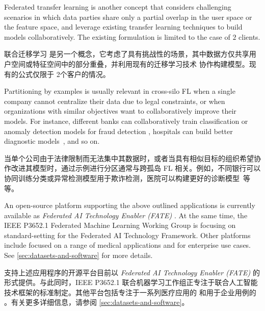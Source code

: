 Federated transfer learning \citep{DBLP:journals/corr/abs-1902-04885} is another concept that considers challenging scenarios in which data parties share only a partial overlap in the user space or the feature space, and leverage existing transfer learning techniques \cite{Pan:2010:STL:1850483.1850545} to build models collaboratively. The existing formulation is limited to the case of $2$ clients.

联合迁移学习 \citep{DBLP:journals/corr/abs-1902-04885} 是另一个概念，它考虑了具有挑战性的场景，其中数据方仅共享用户空间或特征空间中的部分重叠，并利用现有的迁移学习技术 \cite{Pan:2010:STL:1850483.1850545} 协作构建模型。现有的公式仅限于 2个客户的情况。

Partitioning by examples is usually relevant in cross-silo FL when a single company cannot centralize their data due to legal constraints, or when organizations with similar objectives want to collaboratively improve their models. For instance, different banks can collaboratively train classification or anomaly detection models for fraud detection \citep{webankswissre19reinsurance}, hospitals can build better diagnostic models~\citep{courtiol2019deep}, and so on.

当单个公司由于法律限制而无法集中其数据时，或者当具有相似目标的组织希望协作改进其模型时，通过示例进行分区通常与跨孤岛 FL 相关。例如，不同银行可以协同训练分类或异常检测模型用于欺诈检测\citep{webankswissre19reinsurance}，医院可以构建更好的诊断模型~\citep{courtiol2019deep}等等。

An open-source platform supporting the above outlined applications is currently available as \textit{Federated AI Technology Enabler (FATE)} \citep{FATE}. At the same time, the IEEE P3652.1 Federated Machine Learning Working Group is focusing on standard-setting for the Federated AI Technology Framework. Other platforms include \cite{ClaraTraining} focused on a range of medical applications and \cite{IBMFL} for enterprise use cases. See \cref{sec:datasets-and-software} for more details.


支持上述应用程序的开源平台目前以 \textit{Federated AI Technology Enabler (FATE)} \citep{FATE} 的形式提供。与此同时，IEEE P3652.1 联合机器学习工作组正专注于联合人工智能技术框架的标准制定。其他平台包括专注于一系列医疗应用的 \cite{ClaraTraining} 和用于企业用例的 \cite{IBMFL}。有关更多详细信息，请参阅 \cref{sec:datasets-and-software}。


